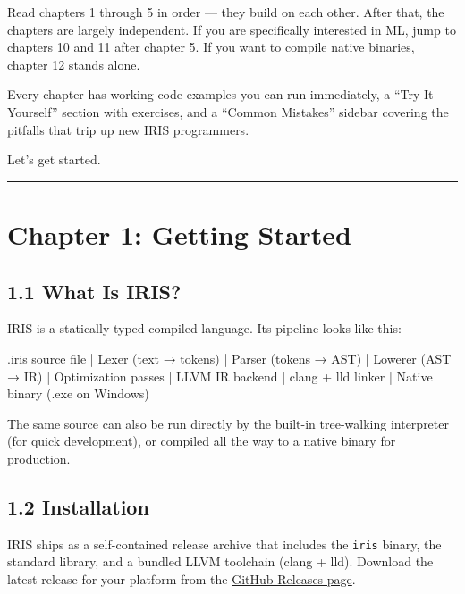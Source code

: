 \documentclass[
  english,
]{book}
\newenvironment{Shaded}{\begin{snugshade}}{\end{snugshade}}
\newcommand{\NormalTok}[1]{\textcolor[rgb]{0.83,0.83,0.83}{#1}}
\begin{document}
Read chapters 1 through 5 in order --- they build on each other. After
that, the chapters are largely independent. If you are specifically
interested in ML, jump to chapters 10 and 11 after chapter 5. If you
want to compile native binaries, chapter 12 stands alone.

Every chapter has working code examples you can run immediately, a ``Try
It Yourself'' section with exercises, and a ``Common Mistakes'' sidebar
covering the pitfalls that trip up new IRIS programmers.

Let's get started.

\begin{center}\rule{0.5\linewidth}{0.5pt}\end{center}

\section{Chapter 1: Getting Started}\label{chapter-1-getting-started}

\subsection{1.1 What Is IRIS?}\label{what-is-iris}

IRIS is a statically-typed compiled language. Its pipeline looks like
this:

\begin{Shaded}
\begin{Highlighting}[]
\NormalTok{.iris source file}
\NormalTok{       |}
\NormalTok{    Lexer  (text → tokens)}
\NormalTok{       |}
\NormalTok{    Parser (tokens → AST)}
\NormalTok{       |}
\NormalTok{    Lowerer (AST → IR)}
\NormalTok{       |}
\NormalTok{  Optimization passes}
\NormalTok{       |}
\NormalTok{  LLVM IR backend}
\NormalTok{       |}
\NormalTok{  clang + lld linker}
\NormalTok{       |}
\NormalTok{  Native binary (.exe on Windows)}
\end{Highlighting}
\end{Shaded}

The same source can also be run directly by the built-in tree-walking
interpreter (for quick development), or compiled all the way to a native
binary for production.

\subsection{1.2 Installation}\label{installation}

IRIS ships as a self-contained release archive that includes the
\texttt{iris} binary, the standard library, and a bundled LLVM toolchain
(clang + lld). Download the latest release for your platform from the
\href{https://github.com/paigeadelethompson/IRIS/releases}{GitHub
Releases page}.
\end{document}
